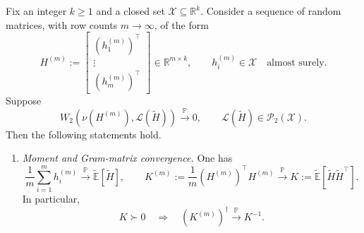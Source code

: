         \begin{lemma}
        \label{lemma:mf-proof-empirical-stability}
        Fix an integer $k\geq1$ and a closed set
        $\mathcal X\subseteq\mathbb R^k$.
        Consider a sequence of random matrices, with row counts
        $m\to\infty$, of the form
        \[
            H^{(m)}
            :=
            \begin{bmatrix}
                (h_1^{(m)})^\top\\
                \vdots\\
                (h_m^{(m)})^\top
            \end{bmatrix}
            \in\mathbb R^{m\times k},
            \qquad
            h_i^{(m)}\in\mathcal X
            \quad\text{almost surely}.
        \]
        Suppose
        \[
            W_2\left(
                \nu(H^{(m)}),
                \mathscr L(\tilde H)
            \right)
            \xrightarrow{\mathbb P}0,
            \qquad
            \mathscr L(\tilde H)\in\mathscr P_2(\mathcal X).
        \]
        Then the following statements hold.
        
        \begin{enumerate}[wide]
            \item \emph{Moment and Gram-matrix convergence.}
            One has
            \[
                \frac1m\sum_{i=1}^m h_i^{(m)}
                \xrightarrow{\mathbb P}
                \tilde{\mathbb E}[\tilde H],
                \qquad
                K^{(m)}
                :=
                \frac1m(H^{(m)})^\top H^{(m)}
                \xrightarrow{\mathbb P}
                K
                :=
                \tilde{\mathbb E}[\tilde H\tilde H^\top].
            \]
            In particular,
            \[
                K\succ0
                \quad\Longrightarrow\quad
                (K^{(m)})^\dagger
                \xrightarrow{\mathbb P}K^{-1}.
            \]
        

\end{enumerate}
\end{lemma}
